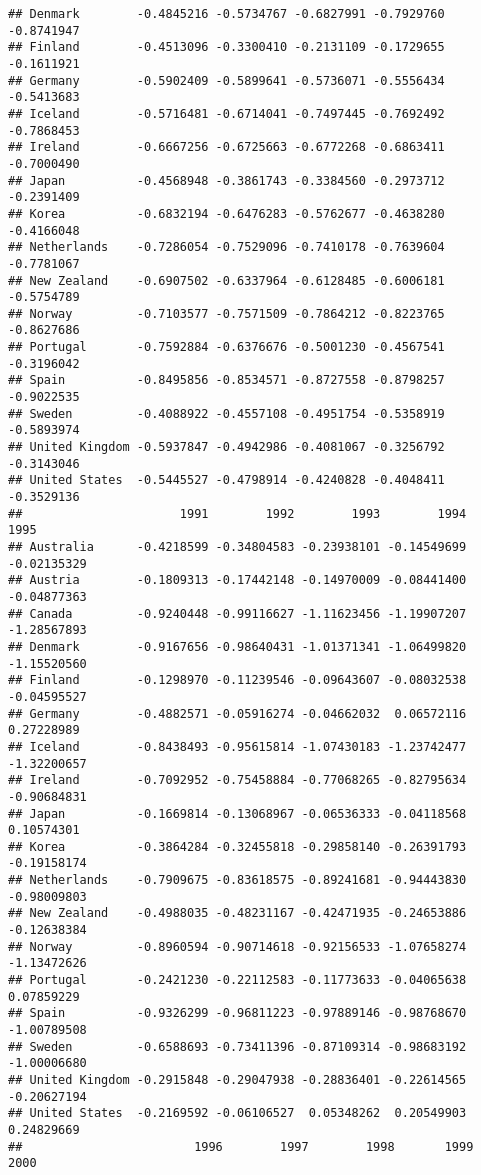 \documentclass[
]{article}
\begin{document}
\begin{verbatim}
## Denmark        -0.4845216 -0.5734767 -0.6827991 -0.7929760 -0.8741947
## Finland        -0.4513096 -0.3300410 -0.2131109 -0.1729655 -0.1611921
## Germany        -0.5902409 -0.5899641 -0.5736071 -0.5556434 -0.5413683
## Iceland        -0.5716481 -0.6714041 -0.7497445 -0.7692492 -0.7868453
## Ireland        -0.6667256 -0.6725663 -0.6772268 -0.6863411 -0.7000490
## Japan          -0.4568948 -0.3861743 -0.3384560 -0.2973712 -0.2391409
## Korea          -0.6832194 -0.6476283 -0.5762677 -0.4638280 -0.4166048
## Netherlands    -0.7286054 -0.7529096 -0.7410178 -0.7639604 -0.7781067
## New Zealand    -0.6907502 -0.6337964 -0.6128485 -0.6006181 -0.5754789
## Norway         -0.7103577 -0.7571509 -0.7864212 -0.8223765 -0.8627686
## Portugal       -0.7592884 -0.6376676 -0.5001230 -0.4567541 -0.3196042
## Spain          -0.8495856 -0.8534571 -0.8727558 -0.8798257 -0.9022535
## Sweden         -0.4088922 -0.4557108 -0.4951754 -0.5358919 -0.5893974
## United Kingdom -0.5937847 -0.4942986 -0.4081067 -0.3256792 -0.3143046
## United States  -0.5445527 -0.4798914 -0.4240828 -0.4048411 -0.3529136
##                      1991        1992        1993        1994        1995
## Australia      -0.4218599 -0.34804583 -0.23938101 -0.14549699 -0.02135329
## Austria        -0.1809313 -0.17442148 -0.14970009 -0.08441400 -0.04877363
## Canada         -0.9240448 -0.99116627 -1.11623456 -1.19907207 -1.28567893
## Denmark        -0.9167656 -0.98640431 -1.01371341 -1.06499820 -1.15520560
## Finland        -0.1298970 -0.11239546 -0.09643607 -0.08032538 -0.04595527
## Germany        -0.4882571 -0.05916274 -0.04662032  0.06572116  0.27228989
## Iceland        -0.8438493 -0.95615814 -1.07430183 -1.23742477 -1.32200657
## Ireland        -0.7092952 -0.75458884 -0.77068265 -0.82795634 -0.90684831
## Japan          -0.1669814 -0.13068967 -0.06536333 -0.04118568  0.10574301
## Korea          -0.3864284 -0.32455818 -0.29858140 -0.26391793 -0.19158174
## Netherlands    -0.7909675 -0.83618575 -0.89241681 -0.94443830 -0.98009803
## New Zealand    -0.4988035 -0.48231167 -0.42471935 -0.24653886 -0.12638384
## Norway         -0.8960594 -0.90714618 -0.92156533 -1.07658274 -1.13472626
## Portugal       -0.2421230 -0.22112583 -0.11773633 -0.04065638  0.07859229
## Spain          -0.9326299 -0.96811223 -0.97889146 -0.98768670 -1.00789508
## Sweden         -0.6588693 -0.73411396 -0.87109314 -0.98683192 -1.00006680
## United Kingdom -0.2915848 -0.29047938 -0.28836401 -0.22614565 -0.20627194
## United States  -0.2169592 -0.06106527  0.05348262  0.20549903  0.24829669
##                        1996        1997        1998       1999       2000

\end{verbatim}
\end{document}
